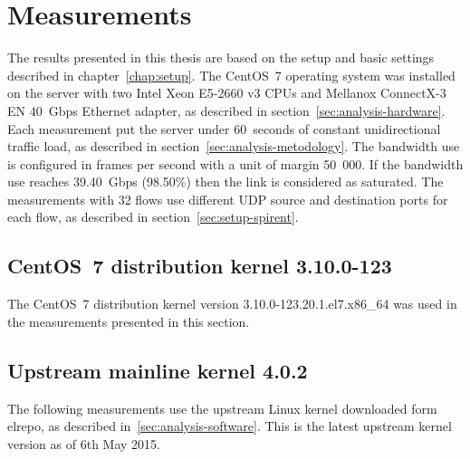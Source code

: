 
\chapter{Measurements}\label{chap:measurements}
The results presented in this thesis are based on the setup and basic settings described in chapter~\ref{chap:setup}.
The CentOS~7 operating system
was installed on the server with two Intel Xeon E5-2660 v3 CPUs
and Mellanox ConnectX-3 EN 40~Gbps Ethernet adapter, as described in section~\ref{sec:analysis-hardware}.
Each measurement put the server under 60~seconds of constant unidirectional traffic load,
as described in section~\ref{sec:analysis-metodology}.
The bandwidth use is configured in frames per second with a unit of margin 50~000.
If the bandwidth use reaches 39.40~Gbps (98.50\%) then the link is considered as saturated.
The measurements with 32 flows use different UDP source and destination ports for each flow,
as described in section~\ref{sec:setup-spirent}.

\section{CentOS~7 distribution kernel 3.10.0-123}
The CentOS~7 distribution kernel version 3.10.0-123.20.1.el7.x86\_64
was used in the measurements presented in this section.

	
	
	
	
	
	
	
	
	
	
	
	
	
	
	

	

\section{Upstream mainline kernel 4.0.2}
The following measurements use the upstream Linux kernel downloaded form elrepo, as described in~\ref{sec:analysis-software}.
This is the latest upstream kernel version as of 6th May 2015.

